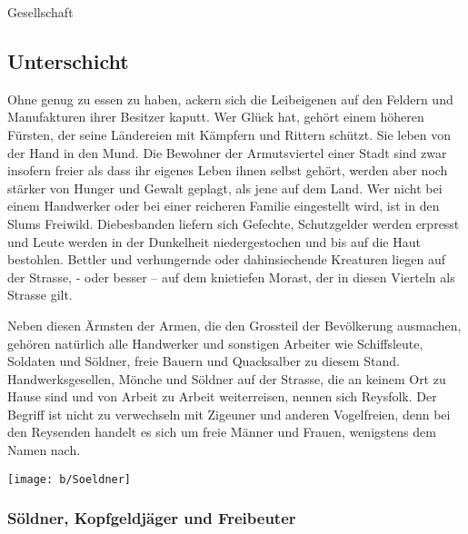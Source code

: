 \documentclass[10pt,twoside,twocolumn,openany]{book}
\newenvironment{mcolsec*}[1]{\section{#1}\begin{multicols}{2}}{
\end{multicols}}
\begin{document}
\begin{mcolsec*}{Gesellschaft}
	
	
	
	\subsection{Unterschicht}
	Ohne genug zu essen zu haben, ackern sich die Leibeigenen auf den Feldern und Manufakturen ihrer Besitzer kaputt. Wer Glück hat, gehört einem höheren Fürsten, der seine Ländereien mit Kämpfern und Rittern schützt. Sie leben von der Hand in den Mund.
	Die Bewohner der Armutsviertel einer Stadt sind zwar insofern freier als dass ihr eigenes Leben ihnen selbst gehört, werden aber noch stärker von Hunger und Gewalt geplagt, als jene auf dem Land. Wer nicht bei einem Handwerker oder bei einer reicheren Familie eingestellt wird, ist in den Slums Freiwild. Diebesbanden liefern sich Gefechte, Schutzgelder werden erpresst und Leute werden in der Dunkelheit niedergestochen und bis auf die Haut bestohlen. Bettler und verhungernde oder dahinsiechende Kreaturen liegen auf der Strasse, - oder besser – auf dem knietiefen Morast, der in diesen Vierteln als Strasse gilt.
	
	Neben diesen Ärmsten der Armen, die den Grossteil der Bevölkerung ausmachen, gehören natürlich alle Handwerker und sonstigen Arbeiter wie Schiffsleute, Soldaten und Söldner, freie Bauern und Quacksalber zu diesem Stand. Handwerksgesellen, Mönche und Söldner auf der Strasse, die an keinem Ort zu Hause sind und von Arbeit zu Arbeit weiterreisen, nennen sich Reysfolk. Der Begriff ist nicht zu verwechseln mit Zigeuner und anderen Vogelfreien, denn bei den Reysenden handelt es sich um freie Männer und Frauen, wenigstens dem Namen nach.
	
	\texttt{[image: b/Soeldner]}
	\subsubsection{Söldner, Kopfgeldjäger und Freibeuter}
	

\end{mcolsec*}
\end{document}
